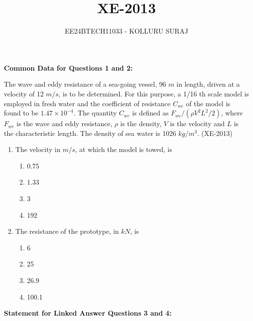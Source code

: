 \documentclass[journal]{IEEEtran}
\numberwithin{equation}{enumi}
\numberwithin{figure}{enumi}
\begin{document}

\title{XE-2013}
\author{EE24BTECH11033 - KOLLURU SURAJ}
{\let\newpage\relax\maketitle}
\textbf{Common Data for Questions 1 and 2:}

The wave and eddy resistance of a sea-going vessel, 96 $m$ in length, driven at a velocity of 12 $m/s$, is to be determined. For this purpose, a 1/16 th scale model is employed in fresh water and the coefficient of resistance $C_{we}$ of the model is found to be $1.47\times10^{-4}$. The quantity $C_{we}$ is defined as $F_{we}/(\rho V^2 L^2 / 2)$, where $F_{we}$ is the wave and eddy resistance, $\rho$ is the density, $V$ is the velocity and $L$ is the characteristic length. The density of sea water is 1026 $kg/m^3$.
\hfill(XE-2013)

\begin{enumerate}
    \item The velocity in $m/s$, at which the model is towed, is
    \begin{multicols}{4}
        \begin{enumerate}
            \item 0.75
            \item 1.33
            \item 3
            \item 192
        \end{enumerate}
    \end{multicols}

    \item The resistance of the prototype, in $kN$, is
    \begin{multicols}{4}
        \begin{enumerate}[label=(\Alph*)]
            \item 6
            \item 25
            \item 26.9
            \item 100.1
        \end{enumerate}
    \end{multicols}
\end{enumerate}

\textbf{Statement for Linked Answer Questions 3 and 4:}
\end{document}
